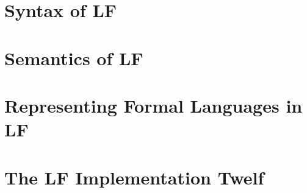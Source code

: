 \documentclass{book}
\begin{document}
\chapter{Syntax of LF}
 

\chapter{Semantics of LF}
 

\chapter{Representing Formal Languages in LF}
  
  
\chapter{The LF Implementation Twelf}\label{sec:twelf}
  
  
%
%  





\end{document}
